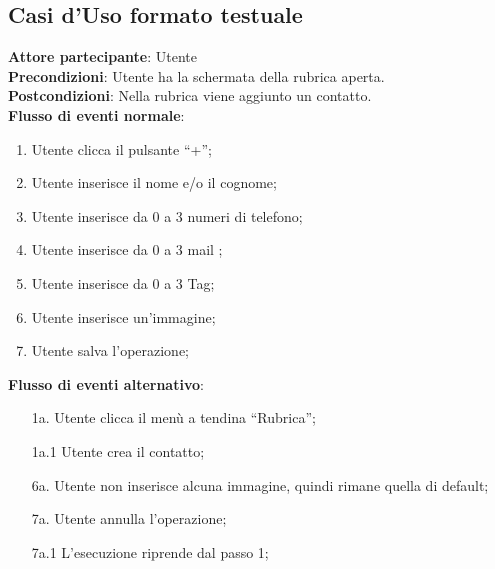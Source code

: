 \subsection{Casi d'Uso formato testuale}
\begin{tcolorbox}[colback=white,colframe=black!80!white,title=\textbf{C1 - Aggiungere contatto}]
\textbf{Attore partecipante}: Utente
\\\textbf{Precondizioni}: Utente ha la schermata della rubrica aperta.
\\\textbf{Postcondizioni}: Nella rubrica viene aggiunto un contatto.
\\\textbf{Flusso di eventi normale}:
\begin{enumerate}[noitemsep, topsep=0pt]
\item Utente clicca il pulsante “+”;
\item Utente inserisce il nome e/o il cognome;
\item Utente inserisce da 0 a 3 numeri di telefono;
\item 	Utente inserisce da 0 a 3 mail ;
\item 	Utente inserisce da 0 a 3 Tag;
\item 	Utente inserisce un’immagine;
\item 	Utente salva l’operazione;
\end{enumerate}
\textbf{Flusso di eventi alternativo}:
\begin{itemize}[noitemsep, topsep=0pt]
	\item[1a. ] Utente clicca il menù a tendina “Rubrica”;
	\item[1a.1] Utente crea il contatto;
	\item[6a. ] Utente non inserisce alcuna immagine, quindi rimane quella di default;
	\item[7a. ] Utente annulla l’operazione;
	\item[7a.1] L’esecuzione riprende dal passo 1;
\end{itemize}
\end{tcolorbox}

